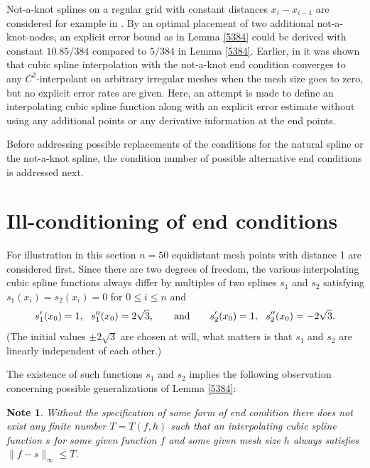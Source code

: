 \documentclass[12pt]{article}
\newtheorem{note}{Note}
\begin{document}
Not-a-knot splines on a regular grid with constant distances $x_i-x_{i-1}$
are considered for example in  \cite{Sun_etal}. By an optimal placement of
two additional not-a-knot-nodes, an explicit error bound as in
Lemma \ref{5384} could be derived with constant $10.85/384$
compared to $5/384$ in Lemma \ref{5384}.
Earlier, in \cite{deBoor} it was shown that cubic spline interpolation with
the not-a-knot end condition converges to any $C^2$-interpolant 
on arbitrary irregular meshes when the mesh size goes to zero,
but no explicit error rates are given.
Here, an attempt is made to define an interpolating
cubic spline function along with an explicit error estimate
without using any additional points or any
derivative information at the end points.


Before addressing possible replacements of the conditions
for the natural spline or the not-a-knot spline,
the condition number of possible alternative end conditions
is addressed next.








\section{Ill-conditioning of end conditions}\label{sec.ill}
For illustration in this section $n=50$ equidistant mesh points with
distance 1 are considered first.
Since there are two degrees of freedom,
the various interpolating cubic spline functions  always differ
by multiples of two splines $s_1$ and $s_2$ satisfying
$s_1(x_i)=s_2(x_i)=0$ for $0\le i\le n$ and
$$
s_1'(x_0) = 1,\ \ s_1''(x_0) =  2\sqrt{3}, \qquad \hbox{and} \qquad
s_2'(x_0) = 1,\ \ s_2''(x_0) = -2\sqrt{3}.
$$
(The initial values $\pm 2\sqrt{3}$ are chosen at will, what matters is that
$s_1$ and $s_2$ are linearly independent of each other.)

The existence of such functions $s_1$ and $s_2$ implies the following
observation concerning possible generalizations of Lemma \ref{5384}:

\begin{note}\label{note0}
  Without the specification of some form of end condition there does not
  exist any finite number $T=T(f,h)$ such that an interpolating cubic spline
  function $s$ for some given function $f$ and some given mesh size $h$
  always satisfies $\|f-s\|_\infty\le  T$.
\end{note}
\end{document}
